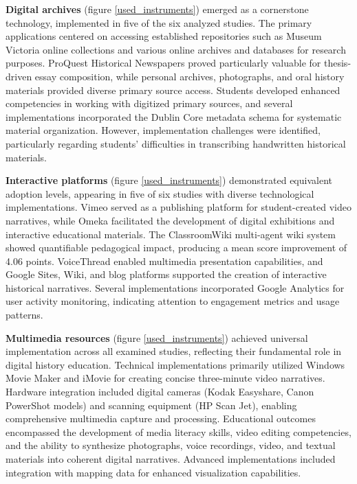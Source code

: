 \documentclass[
hf,
]{ceurart}
\begin{document}
\textbf{Digital archives} (figure \ref{used_instruments}) emerged as a cornerstone technology, implemented in five of the six analyzed studies. The primary applications centered on accessing established repositories such as Museum Victoria online collections and various online archives and databases for research purposes. ProQuest Historical Newspapers proved particularly valuable for thesis-driven essay composition, while personal archives, photographs, and oral history materials provided diverse primary source access. Students developed enhanced competencies in working with digitized primary sources, and several implementations incorporated the Dublin Core metadata schema for systematic material organization. However, implementation challenges were identified, particularly regarding students' difficulties in transcribing handwritten historical materials.

\textbf{Interactive platforms} (figure \ref{used_instruments}) demonstrated equivalent adoption levels, appearing in five of six studies with diverse technological implementations. Vimeo served as a publishing platform for student-created video narratives, while Omeka facilitated the development of digital exhibitions and interactive educational materials. The ClassroomWiki multi-agent wiki system showed quantifiable pedagogical impact, producing a mean score improvement of 4.06 points. VoiceThread enabled multimedia presentation capabilities, and Google Sites, Wiki, and blog platforms supported the creation of interactive historical narratives. Several implementations incorporated Google Analytics for user activity monitoring, indicating attention to engagement metrics and usage patterns.

\textbf{Multimedia resources} (figure \ref{used_instruments}) achieved universal implementation across all examined studies, reflecting their fundamental role in digital history education. Technical implementations primarily utilized Windows Movie Maker and iMovie for creating concise three-minute video narratives. Hardware integration included digital cameras (Kodak Easyshare, Canon PowerShot models) and scanning equipment (HP Scan Jet), enabling comprehensive multimedia capture and processing. Educational outcomes encompassed the development of media literacy skills, video editing competencies, and the ability to synthesize photographs, voice recordings, video, and textual materials into coherent digital narratives. Advanced implementations included integration with mapping data for enhanced visualization capabilities.
\end{document}
